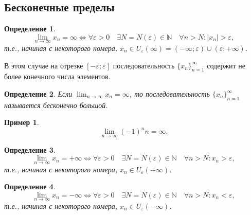 \documentclass[a4paper,12pt]{article} %
\newtheorem{definition}{Определение}[section]
\theoremstyle{remark}
\theoremstyle{definition}
\newtheorem{exmp}{Пример}[section]
\begin{document}
\subsection{Бесконечные пределы}
\begin{definition}
    \[\lim_{n \to \infty} x_n = \infty \iff \forall \varepsilon>0 \quad \exists N = N(\varepsilon) \in \mathbb{N} \quad
    \forall n > N : |x_n| > \varepsilon,\]
    т.е., начиная с некоторого номера, $x_n \in U_\varepsilon(\infty) = (-\infty; \varepsilon)\cup (\varepsilon; +\infty)$.
\end{definition}
В этом случае на отрезке $[-\varepsilon; \varepsilon]$ последовательность $\{x_n\}_{n=1}^{\infty}$ содержит не более конечного
числа элементов.
\begin{center}
\end{center}

\begin{definition}
    Если $\lim_{n \to \infty} x_n = \infty$, то последовательность $\{x_n\}_{n=1}^{\infty}$ называется бесконечно большой.
\end{definition}
\begin{exmp}
    \[\lim_{n \to \infty} (-1)^{n}n = \infty.\] 
\end{exmp}

\begin{definition}
    \[\lim_{n \to \infty} x_n = +\infty \iff \forall \varepsilon>0 \quad \exists N=N(\varepsilon) \in \mathbb{N} \quad
    \forall n> N : x_n > \varepsilon,\] 
    т.е., начиная с некоторого номера, $x_n \in U_\varepsilon(+\infty)$.
\end{definition}

\begin{definition}
    \[\lim_{n \to \infty} x_n = -\infty \iff \forall \varepsilon>0 \quad \exists N=N(\varepsilon) \in \mathbb{N} \quad
    \forall n> N : x_n < \varepsilon,\] 
    т.е., начиная с некоторого номера, $x_n \in U_\varepsilon(-\infty)$.
\end{definition}
\end{document}
